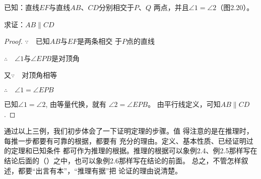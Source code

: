 \begin{example}
	已知：直线$EF$与直线$AB$、$CD$分别相交于$P$、$Q$
两点，并且$\angle 1=\angle 2$（图2.20）。

求证：$AB\parallel CD$
\end{example}

\begin{figure}[htp]
	\centering
{}
	\caption{}
\end{figure}
	

\begin{proof}
$\because\quad $已知$AB$与$EF$是两条相交
于$P$点的直线

$\therefore\quad \angle 1$与$\angle EPB$是对顶角

又$\because\quad $对顶角相等

$\therefore\quad \angle 1=\angle EPB$

已知$\angle 1=\angle 2$, 由等量代换，就有
$\angle 2=\angle EPB$。
由平行线定义，可知$AB\parallel CD$.
\end{proof}

通过以上三例，我们初步体会了一下证明定理的步骤。值
得注意的是在推理时，每推一步都要有可靠的根据，都要有
充分的理由。定义、基本性质、已经证明过的定理和已知条件
都可作为推理的根据。推理的根据可以象例2.4、例2.5那样写在
结论后面的（\qquad）之中，也可以象例2.6那样写在结论的前面。
总之，不管怎样叙述，都要“出言有本”，“推理有据”把
论证的理由说清楚。

